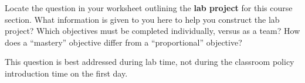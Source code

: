 

Locate the question in your worksheet outlining the {\bf lab project} for this course section.  What information is given to you here to help you construct the lab project?  Which objectives must be completed individually, versus as a team?  How does a ``mastery'' objective differ from a ``proportional'' objective?














This question is best addressed during lab time, not during the classroom policy introduction time on the first day.




